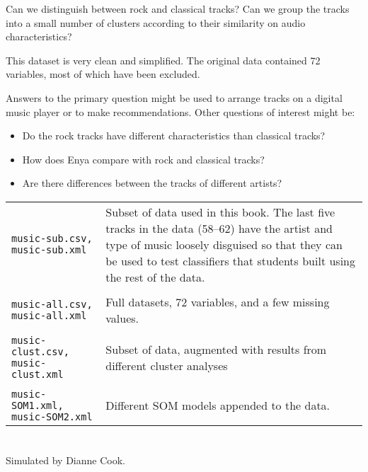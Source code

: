 \bigskip
{} Can we distinguish between rock and classical
tracks?  Can we group the tracks into a small number of clusters
according to their similarity on audio characteristics?

\bigskip 
{} This dataset is very clean and
simplified.  The original data contained 72 variables, most of which
have been excluded.

\bigskip
{} Answers to the primary question might
be used to arrange tracks on a digital music player or to make
recommendations. Other questions of interest might be:

\begin{itemize}
\item Do the rock tracks have different characteristics than classical
tracks?
\item How does Enya compare with rock and classical tracks?
\item Are there differences between the tracks of different artists?
\end{itemize}

\newpage
\bigskip
{}

\begin{tabular}{p{1.4in}p{3in}}
{\tt music-sub.csv, music-sub.xml} & Subset of data used in this book.
The last five tracks in the data (58--62) have the artist and type of
music loosely disguised so that they can be used to test classifiers
that students built using the rest of the data. \\
\\
{\tt music-all.csv, music-all.xml} & Full datasets, 72 variables, 
and a few missing values. \\
\\
{\tt music-clust.csv, music-clust.xml} & Subset of data, augmented with 
results from different cluster analyses \\
\\
{\tt music-SOM1.xml, music-SOM2.xml} & Different SOM models appended to the data. \\
\end{tabular}

\smallskip
{}
\section{}

 Simulated by Dianne Cook.

